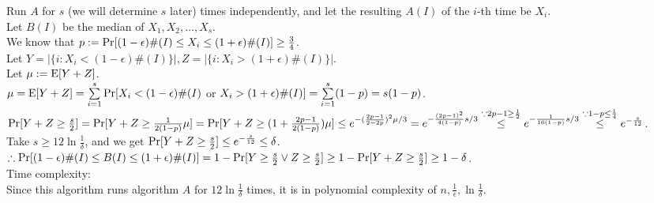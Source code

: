 \begin{pr}
\newcommand{\OPT}{\#(I)}
Run $A$ for $s$ (we will determine $s$ later) times independently, and let the resulting $A(I)$ of the $i$-th time be $X_i$.\\
Let $B(I)$ be the median of $X_1, X_2, \dots, X_s$.\\
We know that $p:=\P[(1-\epsilon)\OPT\leq X_i\leq(1+\epsilon)\OPT]\geq\frac34$.\\
Let $Y=|\{i:X_i<(1-\epsilon)\OPT\}|, Z=|\{i:X_i>(1+\epsilon)\OPT\}|$.\\
Let $\mu:=\E[Y+Z]$.\\
$\mu=\E[Y+Z]=\suml_{i=1}^s\P[X_i<(1-\epsilon)\OPT$ or $X_i>(1+\epsilon)\OPT]=\suml_{i=1}^s(1-p)=s(1-p)$.\\
$\P[Y+Z\geq\frac s2]=\P[Y+Z\geq\frac1{2(1-p)}\mu]=\P[Y+Z\geq(1+\frac{2p-1}{2(1-p)})\mu]\leq e^{-(\frac{2p-1}{2-2p})^2\mu/3}=e^{-\frac{(2p-1)^2}{4(1-p)}s/3}\overset{\cuz2p-1\geq\frac12}\leq e^{-\frac1{16(1-p)}s/3}\overset{\cuz1-p\leq\frac14}\leq e^{-\frac s{12}}$.\\
Take $s\geq12\ln\frac1\delta$, and we get $\P[Y+Z\geq\frac s2]\leq e^{-\frac s{12}}\leq\delta$.\\
$\so\P[(1-\epsilon)\OPT\leq B(I)\leq(1+\epsilon)\OPT]=1-\P[Y\geq\frac s2\lor Z\geq\frac s2]\geq1-\P[Y+Z\geq\frac s2]\geq1-\delta$.\\
Time complexity:\\
Since this algorithm runs algorithm $A$ for $12\ln\frac1\delta$ times, it is in polynomial complexity of $n, \frac1\epsilon, \ln\frac1\delta$.
\end{pr}
